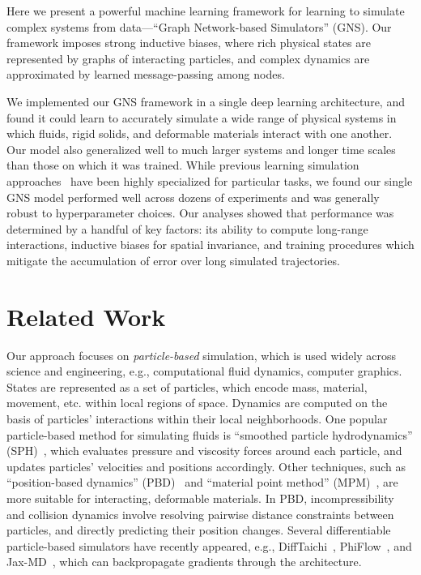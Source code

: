 \documentclass{article}
\begin{document}
Here we present a powerful machine learning framework for learning to simulate complex systems from data---``Graph Network-based Simulators'' (GNS). Our framework imposes strong inductive biases, where rich physical states are represented by graphs of interacting particles, and complex dynamics are approximated by learned message-passing among nodes.

We implemented our GNS framework in a single deep learning architecture, and found it could learn to accurately simulate a wide range of physical systems in which fluids, rigid solids, and deformable materials interact with one another. Our model also generalized well to much larger systems and longer time scales than those on which it was trained. While previous learning simulation approaches~\cite{li2018learning,ummenhofer2020lagrangian} have been highly specialized for particular tasks, we found our single GNS model performed well across dozens of experiments and was generally robust to hyperparameter choices. Our analyses showed that performance was determined by a handful of key factors: its ability to compute long-range interactions, inductive biases for spatial invariance, and training procedures which mitigate the accumulation of error over long simulated trajectories.
%
%
%
%
%
%
 
%
\section{Related Work}
\label{sec:related}

%
Our approach focuses on \textit{particle-based} simulation, which is used widely across science and engineering, e.g., computational fluid dynamics, computer graphics. States are represented as a set of particles, which encode mass, material, movement, etc. within local regions of space. Dynamics are computed on the basis of particles' interactions within their local neighborhoods. One popular particle-based method for simulating fluids is ``smoothed particle hydrodynamics'' (SPH)~\cite{monaghan1992smoothed}, which evaluates pressure and viscosity forces %
around each particle, and updates particles' velocities and positions accordingly. Other techniques, such as ``position-based dynamics'' (PBD)~\cite{muller2007position} and ``material point method'' (MPM)~\cite{sulsky1995application}, are more suitable for interacting, deformable materials. In PBD, incompressibility and collision dynamics involve resolving pairwise distance constraints between particles, and directly predicting their position changes. 
%
Several differentiable particle-based simulators have recently appeared, e.g., DiffTaichi~\cite{hu2019difftaichi}, PhiFlow~\cite{holl2020learning}, and Jax-MD~\cite{schoenholz2019jax}, which can backpropagate gradients through the architecture.
\end{document}
